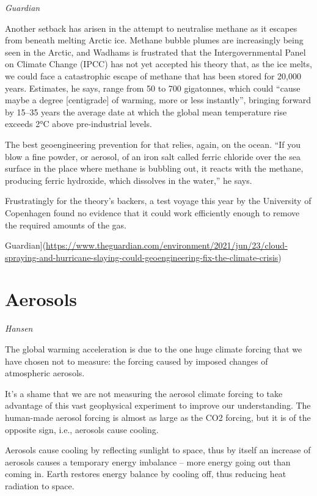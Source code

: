 \documentclass[
]{book}
\begin{document}
\emph{Guardian}

Another setback has arisen in the attempt to neutralise methane as it escapes from beneath melting Arctic ice. Methane bubble plumes are increasingly being seen in the Arctic, and Wadhams is frustrated that the Intergovernmental Panel on Climate Change (IPCC) has not yet accepted his theory that, as the ice melts, we could face a catastrophic escape of methane that has been stored for 20,000 years. Estimates, he says, range from 50 to 700 gigatonnes, which could ``cause maybe a degree {[}centigrade{]} of warming, more or less instantly'', bringing forward by 15--35 years the average date at which the global mean temperature rise exceeds 2°C above pre-industrial levels.

The best geoengineering prevention for that relies, again, on the ocean. ``If you blow a fine powder, or aerosol, of an iron salt called ferric chloride over the sea surface in the place where methane is bubbling out, it reacts with the methane, producing ferric hydroxide, which dissolves in the water,'' he says.

Frustratingly for the theory's backers, a test voyage this year by the University of Copenhagen found no evidence that it could work efficiently enough to remove the required amounts of the gas.

Guardian{]}(\url{https://www.theguardian.com/environment/2021/jun/23/cloud-spraying-and-hurricane-slaying-could-geoengineering-fix-the-climate-crisis})

\hypertarget{aerosols}{%
\section{Aerosols}\label{aerosols}}

\emph{Hansen}

The global warming acceleration is due to the one huge climate forcing that we have chosen not to measure: the forcing caused by imposed changes of atmospheric aerosols.

It's a shame that we are not measuring the aerosol climate forcing to take advantage of this vast geophysical experiment to improve our understanding. The human-made aerosol forcing is almost as large as the CO2 forcing, but it is of the opposite sign, i.e., aerosols cause cooling.

Aerosols cause cooling by reflecting sunlight to space, thus by itself an increase of aerosols causes a temporary energy imbalance -- more energy going out than coming in. Earth restores energy balance by cooling off, thus reducing heat radiation to space.
\end{document}
